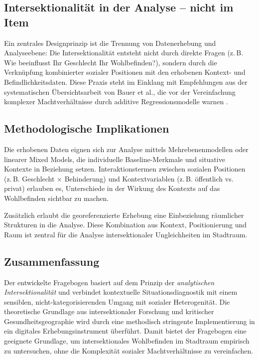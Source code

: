 \subsection*{Intersektionalität in der Analyse – nicht im Item}

Ein zentrales Designprinzip ist die Trennung von Datenerhebung und Analyseebene: Die Intersektionalität entsteht nicht durch direkte Fragen (z.\,B. \glqq Wie beeinflusst Ihr Geschlecht Ihr Wohlbefinden?\grqq), sondern durch die Verknüpfung kombinierter sozialer Positionen mit den erhobenen Kontext- und Befindlichkeitsdaten. Diese Praxis steht im Einklang mit Empfehlungen aus der systematischen Übersichtsarbeit von Bauer et al., die vor der Vereinfachung komplexer Machtverhältnisse durch additive Regressionsmodelle warnen \parencite{bauerIntersectionalityQuantitativeResearch2021}.

\subsection*{Methodologische Implikationen}

Die erhobenen Daten eignen sich zur Analyse mittels Mehrebenenmodellen oder linearer Mixed Models, die individuelle Baseline-Merkmale und situative Kontexte in Beziehung setzen. Interaktionstermen zwischen sozialen Positionen (z.\,B. Geschlecht × Behinderung) und Kontextvariablen (z.\,B. öffentlich vs. privat) erlauben es, Unterschiede in der Wirkung des Kontexts auf das Wohlbefinden sichtbar zu machen.

Zusätzlich erlaubt die georeferenzierte Erhebung eine Einbeziehung räumlicher Strukturen in die Analyse. Diese Kombination aus Kontext, Positionierung und Raum ist zentral für die Analyse intersektionaler Ungleichheiten im Stadtraum.

\subsection*{Zusammenfassung}

Der entwickelte Fragebogen basiert auf dem Prinzip der \emph{analytischen Intersektionalität} und verbindet kontextuelle Situationsdiagnostik mit einem sensiblen, nicht-kategorisierenden Umgang mit sozialer Heterogenität. Die theoretische Grundlage aus intersektionaler Forschung und kritischer Gesundheitsgeographie wird durch eine methodisch stringente Implementierung in ein digitales Erhebungsinstrument überführt. Damit bietet der Fragebogen eine geeignete Grundlage, um intersektionales Wohlbefinden im Stadtraum empirisch zu untersuchen, ohne die Komplexität sozialer Machtverhältnisse zu vereinfachen.

